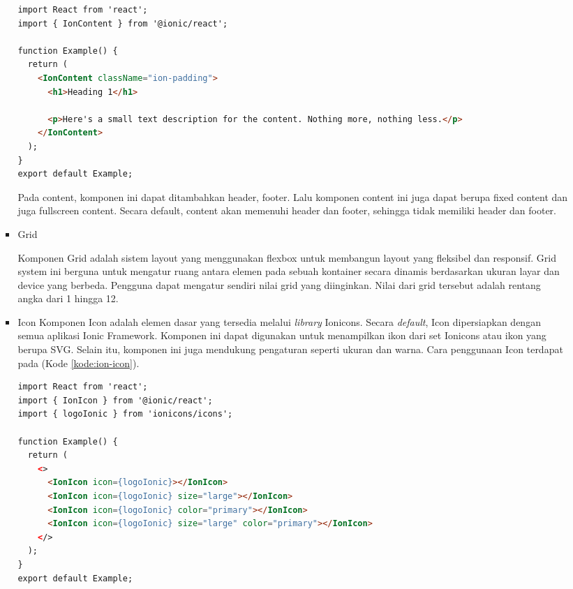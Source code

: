 \documentclass[a4paper,twoside]{article}
\begin{document}
\begin{enumerate}
\begin{itemize}
\begin{itemize}
\begin{lstlisting}[language=HTML, caption=Contoh Potongan Kode Content, label=kode:ion-content, breaklines=true]
import React from 'react';
import { IonContent } from '@ionic/react';

function Example() {
  return (
    <IonContent className="ion-padding">
      <h1>Heading 1</h1>

      <p>Here's a small text description for the content. Nothing more, nothing less.</p>
    </IonContent>
  );
}
export default Example;
\end{lstlisting}

Pada content, komponen ini dapat ditambahkan header, footer. Lalu komponen content ini juga dapat berupa fixed content dan juga fullscreen content. Secara default, content akan memenuhi header dan footer, sehingga tidak memiliki header dan footer.

    \item Grid

    Komponen Grid adalah sistem layout yang menggunakan flexbox untuk membangun layout yang fleksibel dan responsif. Grid system ini berguna untuk mengatur ruang antara elemen pada sebuah kontainer secara dinamis berdasarkan ukuran layar dan device yang berbeda. Pengguna dapat mengatur sendiri nilai grid yang diinginkan. Nilai dari grid tersebut adalah rentang angka dari 1 hingga 12. 

    \item Icon
    \label{subsubsec:icon}
    Komponen Icon adalah elemen dasar yang tersedia melalui \textit{library} Ionicons. Secara \textit{default}, Icon dipersiapkan dengan semua aplikasi Ionic Framework. Komponen ini dapat digunakan untuk menampilkan ikon dari set Ionicons atau ikon yang berupa SVG. Selain itu, komponen ini juga mendukung pengaturan seperti ukuran dan warna. Cara penggunaan Icon terdapat pada (Kode \ref{kode:ion-icon}).

\begin{lstlisting}[language=HTML, caption=Contoh Kode Penggunaan Icon, label=kode:ion-icon, breaklines=true]
import React from 'react';
import { IonIcon } from '@ionic/react';
import { logoIonic } from 'ionicons/icons';

function Example() {
  return (
    <>
      <IonIcon icon={logoIonic}></IonIcon>
      <IonIcon icon={logoIonic} size="large"></IonIcon>
      <IonIcon icon={logoIonic} color="primary"></IonIcon>
      <IonIcon icon={logoIonic} size="large" color="primary"></IonIcon>
    </>
  );
}
export default Example;
\end{lstlisting}


\end{itemize}
\end{itemize}
\end{enumerate}
\end{document}
